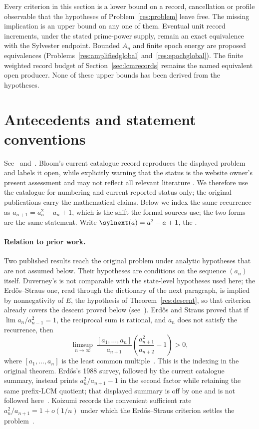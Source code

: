 Every criterion in this section is a lower bound on a record, cancellation or
profile observable that the hypotheses of Problem~\ref{res:problem} leave free.
The missing implication is an upper bound on any one of them.  Eventual unit
record increments, under the stated prime-power supply, remain an exact
equivalence with the Sylvester endpoint.  Bounded $A_n$ and finite epoch energy
are proposed equivalences (Problems~\ref{res:amplifiedglobal}
and~\ref{res:epochglobal}).  The finite weighted record budget of
Section~\ref{sec:lcmrecords} remains the named equivalent open producer.  None
of these upper bounds has been derived from the hypotheses.



\section{Antecedents and statement conventions}\label{app:antecedents}

\noindent See~\cite[p.~64]{erdosgraham1980} and~\cite[p.~105]{erdos1988}.
Bloom's current catalogue record reproduces the displayed problem and labels
it open, while explicitly warning that the status is the website owner's
present assessment and may not reflect all relevant literature
\cite{erdosproblems}.  We therefore use the catalogue for numbering and
current reported status only; the original publications carry the
mathematical claims.  Below we index the same recurrence as
$a_{n+1}=a_n^{2}-a_n+1$, which is the shift the formal sources use; the two
forms are the same statement.  Write $\sylnext(a)=a^{2}-a+1$, the
.

\paragraph{Relation to prior work.}
Two published results reach the original problem under analytic hypotheses that
are not assumed below.  Their hypotheses are conditions on the sequence $(a_n)$
itself.  Duverney's is not comparable with the state-level hypotheses used
here; the Erd\H{o}s--Straus one, read through the dictionary of the next
paragraph, is implied by nonnegativity of $E$, the hypothesis of
Theorem~\ref{res:descent}, so that criterion already covers the descent proved
below (see~\cite[Cor.~4(1) and Prop.~1(1), pp.~14--15]{koizumi2025}).
Erd\H{o}s and Straus proved that if $\lim a_n/a_{n-1}^{2}=1$, the reciprocal
sum is rational, and $a_n$ does not satisfy the recurrence, then
\[
 \limsup_{n\to\infty}\ \frac{[a_1,\ldots,a_n]}{a_{n+1}}
 \left(\frac{a_{n+1}^{2}}{a_{n+2}}-1\right)>0,
\]
where $[a_1,\ldots,a_n]$ is the least common
multiple~\cite[Theorem~3, p.~132]{erdosstraus1964}.  This is the indexing in
the original theorem.  Erd\H{o}s's 1988 survey, followed by the current
catalogue summary, instead prints $a_n^2/a_{n+1}-1$ in the second factor while
retaining the same prefix-LCM quotient; that displayed summary is off by one
and is not followed here~\cite[p.~105]{erdos1988}\cite{erdosproblems}.
Koizumi records the convenient sufficient rate
$a_n^2/a_{n+1}=1+o(1/n)$ under which the Erd\H{o}s--Straus criterion settles
the problem~\cite[Remark~3, p.~16]{koizumi2025}.

